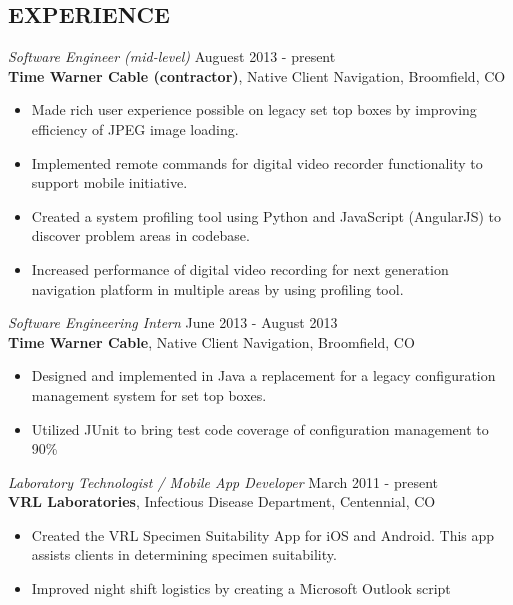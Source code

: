 \documentclass[margin]{res}
\begin{document}
\begin{resume}
\section{EXPERIENCE}
        {\sl Software Engineer (mid-level)} \hfill Auguest 2013 - present \\
        {\bf Time Warner Cable (contractor)}, Native Client Navigation, Broomfield, CO
        \begin{itemize} \itemsep -2pt
        \item Made rich user experience possible on legacy set top boxes by improving efficiency of JPEG image loading.
        \item Implemented remote commands for digital video recorder functionality to support mobile initiative.
        \item Created a system profiling tool using Python and JavaScript (AngularJS) to discover problem areas in codebase.
        \item Increased performance of digital video recording for next generation navigation platform in multiple areas by using profiling tool.
        \end{itemize}
        {\sl Software Engineering Intern} \hfill June 2013 - August 2013 \\
        {\bf Time Warner Cable}, Native Client Navigation, Broomfield, CO
        \begin{itemize} \itemsep -2pt
        \item Designed and implemented in Java a replacement for a legacy configuration management system for set top boxes.
        \item Utilized JUnit to bring test code coverage of configuration management to 90\%
        \end{itemize}
		{\sl Laboratory Technologist / Mobile App Developer} \hfill March 2011 - present \\
        {\bf VRL Laboratories}, Infectious Disease Department, Centennial, CO 
        \begin{itemize}  \itemsep -2pt %
		\item Created the VRL Specimen Suitability App for iOS and Android. 
			This app assists clients in determining specimen suitability.
        \item	Improved night shift logistics by creating a Microsoft Outlook script

\end{itemize}
\end{resume}
\end{document}

